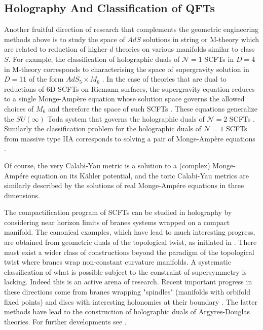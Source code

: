 \documentclass[12pt]{article}
\begin{document}
 \subsection{Holography And Classification of QFTs}  
 
 
 Another fruitful direction of research that complements the geometric engineering methods above is to study the space of $AdS$ solutions in string or M-theory which are related to reduction of higher-$d$ theories on various manifolds similar to class $S$.  For example, the classification of holographic duals of $\mathcal{N}=1$ SCFTs in $D=4$ in M-theory corresponds to characterising the space of supergravity solution in $D=11$ of the form $AdS_5 \times M_6$ \cite{Gauntlett:2004zh}.  In the case of theories that are dual to reductions of 6D SCFTs on Riemann surfaces, the supergravity equation reduces to a single Monge-Amp{\`e}re equation whose solution space governs the allowed choices of $M_6$ and therefore the space of such SCFTs \cite{Bah:2013qya,Bah:2015fwa}. These equations generalize the $SU(\infty)$ Toda system that governs the holographic duals of $\mathcal{N}=2$ SCFTs \cite{Gaiotto:2009gz}.  Similarly the classification problem for the holographic duals of $\mathcal{N}=1$ SCFTs from massive type IIA corresponds to solving a pair of Monge-Amp{\`e}re equations \cite{Bah:2017wxp}.  
 
 Of course, the very Calabi-Yau metric is a solution to a (complex) Monge-Amp{\'e}re equation on its K{\"a}hler potential, and the toric
 Calabi-Yau metrics are similarly described by the solutions of real Monge-Amp{\'e}re equations in three dimensions. 
 
The compactification program of SCFTs can be studied in holography by considering near horizon limits of branes systems wrapped on a compact manifold.  The canonical examples, which have lead to much interesting progress, are obtained from geometric duals of the topological twist, as initiated in \cite{Maldacena:2000mw}. There must exist a wider class of constructions beyond the paradigm of the topological twist where branes wrap non-constant curvature manifolds.  A systematic classification of what is possible subject to the constraint of supersymmetry is lacking. Indeed this is an active arena of research.  Recent important progress in these directions come from branes wrapping "spindles" (manifolds with orbifold fixed points) \cite{Ferrero:2020laf,Faedo:2021nub,Ferrero:2021etw,Ferrero:2021wvk} and discs with interesting holonomies at  their boundary \cite{Bah:2021hei,Bah:2021mzw}.  The latter methods have lead to the construction of holographic duals of Argyres-Douglas theories. For further developments see \cite{Couzens:2021rlk,Suh:2021aik,Couzens:2021cpk,Karndumri:2022wpu,Suh:2021hef}.   
\end{document}
